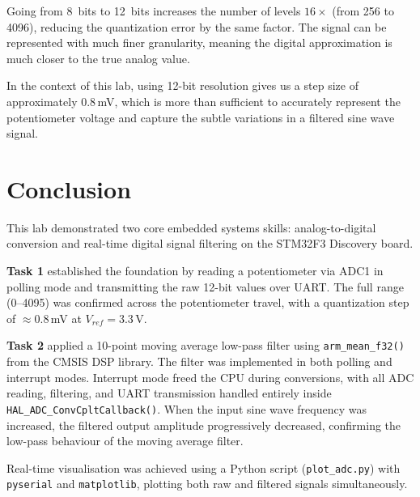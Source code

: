 \documentclass[12pt,a4paper]{article}
\begin{document}
Going from 8~bits to 12~bits increases the number of levels $16\times$ (from 256 to 4096), reducing the quantization error by the same factor. The signal can be represented with much finer granularity, meaning the digital approximation is much closer to the true analog value.

In the context of this lab, using 12-bit resolution gives us a step size of approximately 0.8\,mV, which is more than sufficient to accurately represent the potentiometer voltage and capture the subtle variations in a filtered sine wave signal.

\section{Conclusion}

This lab demonstrated two core embedded systems skills: analog-to-digital conversion and real-time digital signal filtering on the STM32F3 Discovery board.

\textbf{Task 1} established the foundation by reading a potentiometer via ADC1 in polling mode and transmitting the raw 12-bit values over UART. The full range (0--4095) was confirmed across the potentiometer travel, with a quantization step of $\approx 0.8$\,mV at $V_{ref} = 3.3$\,V.

\textbf{Task 2} applied a 10-point moving average low-pass filter using \texttt{arm\_mean\_f32()} from the CMSIS DSP library. The filter was implemented in both polling and interrupt modes. Interrupt mode freed the CPU during conversions, with all ADC reading, filtering, and UART transmission handled entirely inside \texttt{HAL\_ADC\_ConvCpltCallback()}. When the input sine wave frequency was increased, the filtered output amplitude progressively decreased, confirming the low-pass behaviour of the moving average filter.

Real-time visualisation was achieved using a Python script (\texttt{plot\_adc.py}) with \texttt{pyserial} and \texttt{matplotlib}, plotting both raw and filtered signals simultaneously.
\end{document}
